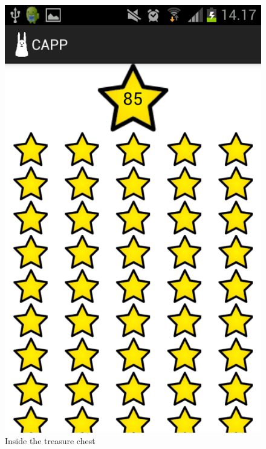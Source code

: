 \begin{figure}[H]
\begin{minipage}[b]{0.3\linewidth}
			\includegraphics[width=0.20\paperwidth]{Pictures/app-screenshots/capp_stars.png}
		\caption{Inside the treasure chest}
		\label{fig:capp_stars}
	\end{minipage}
	\begin{minipage}[b]{0.3\linewidth}	
		\centering

\end{minipage}
\end{figure}
